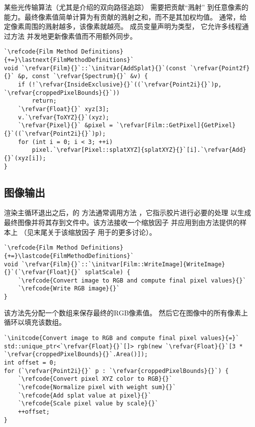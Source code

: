 某些光传输算法（尤其是介绍的双向路径追踪）
需要把贡献“溅射”
到任意像素的能力。最终像素值简单计算为有贡献的溅射之和，而不是其加权均值。
通常，给定像素周围的溅射越多，该像素就越亮。
成员变量声明为类型，
它允许多线程通过方法
并发地更新像素值而不用额外同步。
\begin{lstlisting}
`\refcode{Film Method Definitions}{+=}\lastnext{FilmMethodDefinitions}`
void `\refvar{Film}{}`::`\initvar{AddSplat}{}`(const `\refvar{Point2f}{}` &p, const `\refvar{Spectrum}{}` &v) {
    if (!`\refvar{InsideExclusive}{}`((`\refvar{Point2i}{}`)p, `\refvar{croppedPixelBounds}{}`))
        return;
    `\refvar{Float}{}` xyz[3];
    v.`\refvar{ToXYZ}{}`(xyz);
    `\refvar{Pixel}{}` &pixel = `\refvar[Film::GetPixel]{GetPixel}{}`((`\refvar{Point2i}{}`)p);
    for (int i = 0; i < 3; ++i)
        pixel.`\refvar[Pixel::splatXYZ]{splatXYZ}{}`[i].`\refvar{Add}{}`(xyz[i]);
}
\end{lstlisting}

\subsection{图像输出}\label{sub:图像输出}
渲染主循环退出之后，的
方法通常调用方法\linebreak
{}，它指示胶片进行必要的处理
以生成最终图像并将其存到文件中。该方法接收一个缩放因子
并应用到由方法提供的样本上
（见末尾关于该缩放因子
用于的更多讨论）。
\begin{lstlisting}
`\refcode{Film Method Definitions}{+=}\lastcode{FilmMethodDefinitions}`
void `\refvar{Film}{}`::`\initvar[Film::WriteImage]{WriteImage}{}`(`\refvar{Float}{}` splatScale) {
    `\refcode{Convert image to RGB and compute final pixel values}{}`
    `\refcode{Write RGB image}{}`
}
\end{lstlisting}
该方法先分配一个数组来保存最终的RGB像素值。
然后它在图像中的所有像素上循环以填充该数组。
\begin{lstlisting}
`\initcode{Convert image to RGB and compute final pixel values}{=}`
std::unique_ptr<`\refvar{Float}{}`[]> rgb(new `\refvar{Float}{}`[3 * `\refvar{croppedPixelBounds}{}`.Area()]);
int offset = 0;
for (`\refvar{Point2i}{}` p : `\refvar{croppedPixelBounds}{}`) {
    `\refcode{Convert pixel XYZ color to RGB}{}`
    `\refcode{Normalize pixel with weight sum}{}`
    `\refcode{Add splat value at pixel}{}`
    `\refcode{Scale pixel value by scale}{}`
    ++offset;
}
\end{lstlisting}


